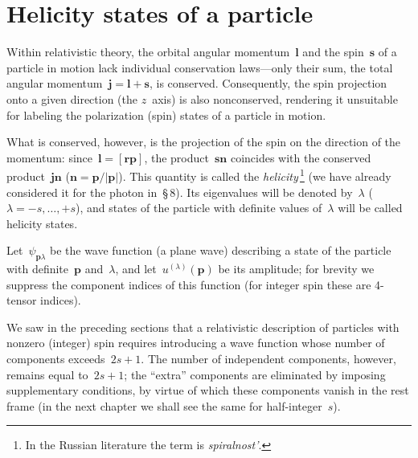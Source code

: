 \section{Helicity states of a particle\protect\footnotemark}

Within relativistic theory, the orbital angular momentum~$\mathbf{l}$ and the spin~$\mathbf{s}$ of a particle in motion lack individual conservation laws---only their sum, the total angular momentum~$\mathbf{j} = \mathbf{l} + \mathbf{s}$, is conserved. Consequently, the spin projection onto a given direction (the $z$~axis) is also nonconserved, rendering it unsuitable for labeling the polarization (spin) states of a particle in motion.

What is conserved, however, is the projection of the spin on the direction of the momentum: since~$\mathbf{l} = [\mathbf{rp}]$, the product~$\mathbf{sn}$ coincides with the conserved product~$\mathbf{jn}$ ($\mathbf{n} = \mathbf{p}/|\mathbf{p}|$). This quantity is called the \emph{helicity}\,\footnote{In the Russian literature the term is \emph{spiralnost'}.} (we have already considered it for the photon in~\S\,8). Its eigenvalues will be denoted by~$\lambda$ ($\lambda = -s, \ldots, +s$), and states of the particle with definite values of~$\lambda$ will be called helicity states.

Let~$\psi_{\mathbf{p}\lambda}$ be the wave function (a plane wave) describing a state of the particle with definite~$\mathbf{p}$ and~$\lambda$, and let~$u^{(\lambda)}(\mathbf{p})$ be its amplitude; for brevity we suppress the component indices of this function (for integer spin these are 4-tensor indices).

We saw in the preceding sections that a relativistic description of particles with nonzero (integer) spin requires introducing a wave function whose number of components exceeds~$2s + 1$. The number of independent components, however, remains equal to~$2s + 1$; the ``extra'' components are eliminated by imposing supplementary conditions, by virtue of which these
components vanish in the rest frame (in the next chapter we shall see the same for half-integer~$s$).

